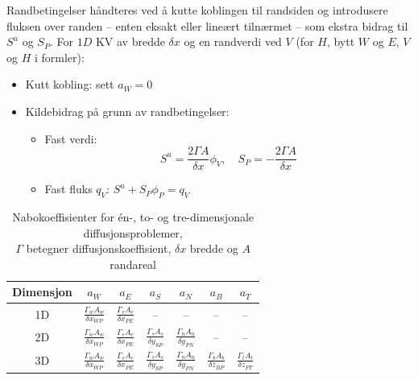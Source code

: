 Randbetingelser håndteres ved å kutte koblingen til randsiden og introdusere fluksen over randen – enten eksakt eller lineært tilnærmet – som ekstra bidrag til $S^u$ og $S_P$. For $1D$ KV av bredde $\delta x$ og en randverdi ved $V$ (for $H$, bytt $W$ og $E$, $V$ og $H$ i formler):
\begin{itemize}
\item Kutt kobling: sett $a_W = 0$ 
\item  Kildebidrag på grunn av randbetingelser:
  \begin{itemize}
  \item Fast verdi: 
    \[
    S^u = \frac{2 \Gamma A}{\delta x} \phi_V, \quad S_P = -\frac{2 \Gamma A}{\delta x}
    \]
  \item Fast fluks $q_V$: 
    $
    S^u + S_P \phi_P = q_V
    $
    \end{itemize}
    \end{itemize}

\renewcommand{\arraystretch}{2}
\begin{table}[h!]
\centering
\begin{tabular}{|c|c|c|c|c|c|c|}
\hline
Dimensjon & $a_W$ & $a_E$ & $a_S$ & $a_N$ & $a_B$ & $a_T$ \\
\hline
1D  & $\frac{\Gamma_w A_w}{\delta x_{WP}}$ & $\frac{\Gamma_e A_e}{\delta x_{PE}}$ & -- & -- & -- & -- \\
\hline
2D & $\frac{\Gamma_w A_w}{\delta x_{WP}}$ & $\frac{\Gamma_e A_e}{\delta x_{PE}}$ & $\frac{\Gamma_s A_s}{\delta y_{SP}}$ & $\frac{\Gamma_n A_n}{\delta y_{PN}}$ & -- & -- \\
\hline
3D & $\frac{\Gamma_w A_w}{\delta x_{WP}}$ & $\frac{\Gamma_e A_e}{\delta x_{PE}}$ & $\frac{\Gamma_s A_s}{\delta y_{SP}}$ & $\frac{\Gamma_n A_n}{\delta y_{PN}}$ & $\frac{\Gamma_b A_b}{\delta z_{BP}}$ & $\frac{\Gamma_t A_t}{\delta z_{PT}}$ \\
\hline
\end{tabular}
\caption{Nabokoeffisienter for én-, to- og tre-dimensjonale diffusjonsproblemer,\\ $\Gamma$ betegner diffusjonskoeffisient, $\delta x$ bredde og $A$ randareal}
\label{tab:koeffisienter}
\end{table}